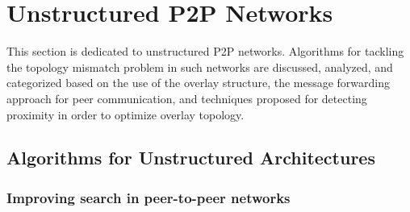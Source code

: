 \section{Unstructured P2P Networks}
\label{section:unstructured}

This section is dedicated to unstructured P2P networks. Algorithms
for tackling the topology mismatch problem in such
networks are discussed, analyzed, and categorized based on the use of the
overlay structure, the message forwarding approach for peer communication, and
techniques proposed for detecting proximity in order to optimize overlay
topology.


%
%
%


\subsection{Algorithms for Unstructured Architectures}


\subsubsection{Improving search in peer-to-peer networks}

